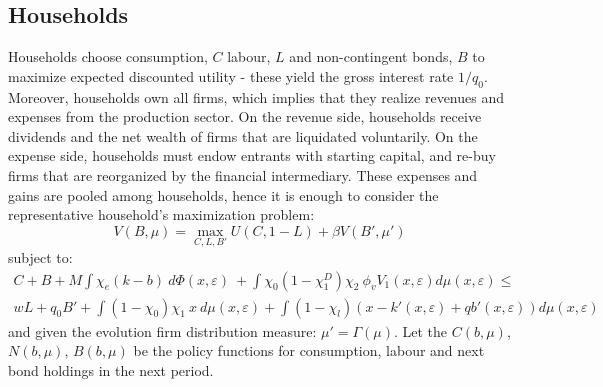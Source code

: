 \documentclass[12pt]{article}
\begin{document}
\subsection{Households}\label{sec:hh}
Households choose consumption, $C$ labour, $L$ and non-contingent bonds, $B$ to maximize expected discounted utility - these yield the gross interest rate $1/q_0$. Moreover, households own all firms, which implies that they realize revenues and expenses from the production sector. On the revenue side, households receive dividends and the net wealth of firms that are liquidated voluntarily. On the expense side, households must endow entrants with starting capital, and re-buy firms that are reorganized by the financial intermediary. These expenses and gains are pooled among households, hence it is enough to consider the representative household's maximization problem:
\begin{equation} \label{eq:U_max}
V(B, \mu) = \max_{C,L,B'} U(C, 1-L) + \beta V(B', \mu')
\end{equation}  
subject to: 
\begin{multline} \label{eq:const_hh}
C + B + M \int  \chi_e (k-b) \ d \Phi(x,\varepsilon) \ + \int \chi_0 (1-\chi_1^D) \chi_2 \ \phi_v V_1(x,\varepsilon) d \mu(x,\varepsilon)  \leq \\  wL + q_0 B' + \int (1 - \chi_0) \chi_1 \ x \ d \mu(x,\varepsilon) + \int (1-\chi_l) \left( x - k'(x,\varepsilon) + qb'(x,\varepsilon) \right) d \mu(x,\varepsilon)
\end{multline} 
and given the evolution firm distribution measure: $\mu' = \Gamma(\mu)$. Let the $C(b,\mu)$, $N(b,\mu)$, $B(b,\mu)$ be the policy functions for consumption, labour and next bond holdings in the next period. 

\newpage
\end{document}
